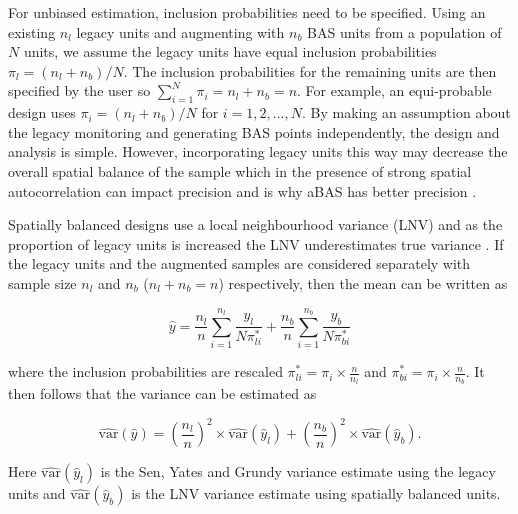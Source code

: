 \documentclass[titlepage]{article}
\begin{document}
For unbiased estimation, inclusion probabilities need to be specified. Using an existing $n_l$ legacy units and augmenting with $n_b$ BAS units from a population of $N$ units, we assume the legacy units have equal inclusion probabilities $\pi_l = (n_l + n_b)/N$. The inclusion probabilities for the remaining units are then specified by the user so $\sum_{i = 1}^{N} \pi_i = n_l + n_b = n$. For example, an equi-probable design uses $\pi_i = (n_l + n_b)/N$ for $i = 1,2,..., N$. By making an assumption about the legacy monitoring and generating BAS points independently, the design and analysis is simple. However, incorporating legacy units this way may decrease the overall spatial balance of the sample which in the presence of strong spatial autocorrelation can impact precision and is why aBAS has better precision \citep{Foster2017}.

Spatially balanced designs use a local neighbourhood variance (LNV) \citep{StevensOlsen2003} and as the proportion of legacy units is increased the LNV underestimates true variance \citep{Foster2017}. If the legacy units and the augmented samples are considered separately with sample size $n_l$ and $n_b$ ($n_l + n_b = n$) respectively, then the mean can be written as  

\begin{equation}
\hat{y} = \frac{n_l}{n}\sum_{i = 1}^{n_l}\frac{y_l}{N \pi_{li}^*} + \frac{n_b}{n}\sum_{i = 1}^{n_b}\frac{y_b}{N \pi_{bi}^*}
\end{equation} 

\noindent where the inclusion probabilities are rescaled $\pi_{li}^* = \pi_{i} \times \frac{n}{n_l}$ and $\pi_{bi}^* = \pi_{i} \times \frac{n}{n_b}$. It then follows that the variance can be estimated as

\begin{equation}\label{VAReq}
\widehat{\text{var}}(\hat{y}) = \left(\frac{n_l}{n}\right)^2 \times \widehat{\text{var}}(\hat{y}_l) + \left(\frac{n_b}{n}\right)^2 \times \widehat{\text{var}}(\hat{y}_b).
\end{equation}

\noindent Here $\widehat{\text{var}}(\hat{y}_l)$ is the Sen, Yates and Grundy variance estimate using the legacy units and $\widehat{\text{var}}(\hat{y}_b)$ is the LNV variance estimate using spatially balanced units. 
\end{document}
